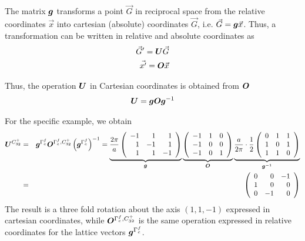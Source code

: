 \documentclass[11pt,a4paper]{report}
\begin{document}
The matrix $\bm{g}$ transforms a point $\vec{G}$ in reciprocal space
from the relative coordinates $\vec{x}$ into cartesian (absolute)
coordinates $\vec{G}$, i.e. $\vec{G}=\bm{g}\vec{x}$.  Thus, a
transformation can be written in relative and absolute coordinates as
\begin{eqnarray}
\vec{G}'=\bm{U}\vec{G}
\nonumber\\
\vec{x'}=\bm{O}\vec{x}
\end{eqnarray}

Thus, the operation $\bm{U}$ in Cartesian coordinates is obtained from
$\bm{O}$
\begin{eqnarray}
\bm{U}=\bm{g}\bm{O}\bm{g}^{-1}
\label{eqLfromotiuing}
\end{eqnarray}

For the specific example, we obtain
\begin{eqnarray}
\bm{U}^{C^+_{32}}&=&\bm{g}^{\Gamma^f_c}\bm{O}^{\Gamma^f_c,C^+_{32}}
\left(\bm{g}^{\Gamma^f_c}\right)^{-1}
=
\underbrace{\frac{2\pi}{a}\left(\begin{array}{rrr}
-1 & 1& 1\\
 1 & -1& 1\\
 1 & 1& -1 \\
\end{array}\right)}_{\bm{g}}
\underbrace{\left(\begin{array}{ccc}
-1 & 1 & 0 \\
-1 & 0 & 0 \\
-1 & 0 & 1\\
\end{array}\right)}_{\bm{O}}
\underbrace{\frac{a}{2\pi}\cdot\frac{1}{2}
\left(\begin{array}{rrr}
0 & 1& 1\\
 1 & 0& 1\\
 1 & 1& 0 \\
\end{array}\right)}_{\bm{g}^{-1}}
\nonumber\\
&=&\left(\begin{array}{rrr}
 0 &  0& -1\\
 1 &  0&  0\\
 0 & -1&  0 \\
\end{array}\right)
\end{eqnarray}
The result is a three fold rotation about the axis $(1,1,-1)$
expressed in cartesian coordinates, while
$\bm{O}^{\Gamma^f_c,C^+_{32}}$ is the same operation expressed in
relative coordinates for the lattice vectors $\bm{g}^{\Gamma^f_c}$.
\end{document}
